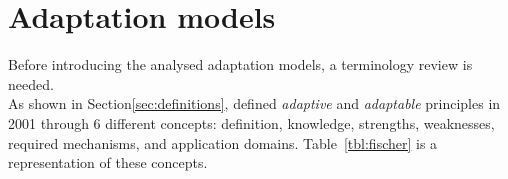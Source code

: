 \section{Adaptation models}
\label{sec:adaptation_models}

Before introducing the analysed adaptation models, a terminology review is
needed. \\

As shown in Section\ref{sec:definitions}, \citet{fischer_user_2001} defined 
\textit{adaptive} and \textit{adaptable} principles in 2001 through 6 different 
concepts: definition, knowledge, strengths, weaknesses, required mechanisms, and 
application domains. Table~\ref{tbl:fischer} is a representation of these concepts.

